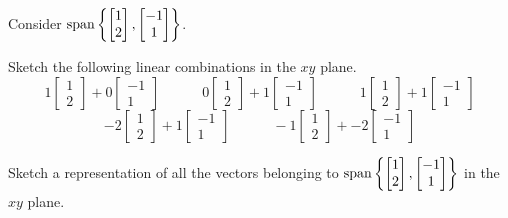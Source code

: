 \begin{activity}{10}
  Consider \(\operatorname{span}\left\{\begin{bmatrix}1\\2\end{bmatrix},
  \begin{bmatrix}-1\\1\end{bmatrix}\right\}\).
  \begin{subactivity}
    Sketch the following linear combinations in the \(xy\) plane.
    \[
    1\begin{bmatrix}1\\2\end{bmatrix}+
    0\begin{bmatrix}-1\\1\end{bmatrix}\hspace{3em}
    0\begin{bmatrix}1\\2\end{bmatrix}+
    1\begin{bmatrix}-1\\1\end{bmatrix}\hspace{3em}
    1\begin{bmatrix}1\\2\end{bmatrix}+
    1\begin{bmatrix}-1\\1\end{bmatrix}
    \]
    \[
    -2\begin{bmatrix}1\\2\end{bmatrix}+
    1\begin{bmatrix}-1\\1\end{bmatrix}\hspace{3em}
    -1\begin{bmatrix}1\\2\end{bmatrix}+
    -2\begin{bmatrix}-1\\1\end{bmatrix}
    \]
  \end{subactivity}
  \begin{subactivity}
    Sketch a representation of all the vectors belonging to
    \(\operatorname{span}\left\{\begin{bmatrix}1\\2\end{bmatrix},
     \begin{bmatrix}-1\\1\end{bmatrix}\right\}\)
    in the \(xy\) plane.
  \end{subactivity}
\end{activity}

